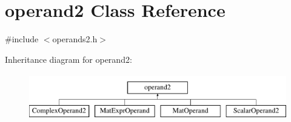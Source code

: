 \hypertarget{classoperand2}{}\section{operand2 Class Reference}
\label{classoperand2}


{\ttfamily \#include $<$operands2.\+h$>$}

Inheritance diagram for operand2\+:\begin{figure}[H]
\begin{center}
\leavevmode
\includegraphics[height=2.000000cm]{classoperand2}
\end{center}
\end{figure}
